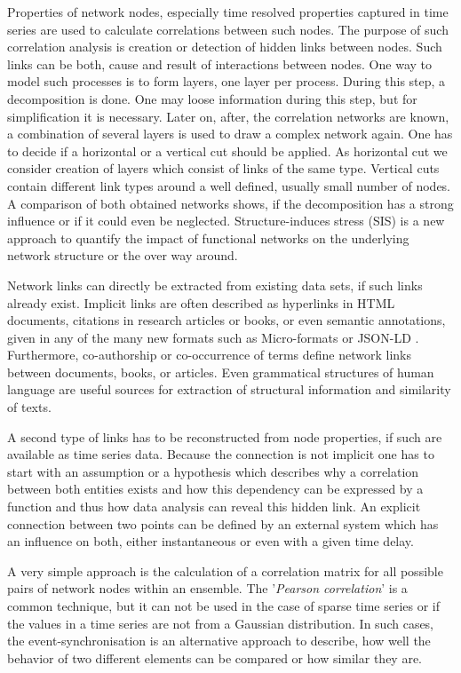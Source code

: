 \documentclass[a4paper,10pt]{scrbook}
\begin{document}
Properties of network nodes, especially time resolved properties captured in time series are used to calculate correlations between such nodes. The purpose of such correlation analysis is creation or detection of hidden links between nodes. Such links can be both, cause and result of interactions between nodes. One way to model such processes is to form layers, one layer per process. During this step, a decomposition is done. One may loose information during this step, but for simplification it is necessary. Later on, after, the correlation networks are known, a combination of several layers is used to draw a complex network again. One has to decide if a horizontal or a vertical cut should be applied. As horizontal cut we consider creation of layers which consist of links of the same type. Vertical cuts contain different link types around a well defined, usually small number of nodes. A comparison of both obtained networks shows, if the decomposition has a strong influence or if it could even be neglected. Structure-induces stress (SIS) is a new approach to quantify the impact of functional networks on the underlying network structure or the over way around.  

Network links can directly be extracted from existing data sets, if such links already exist. Implicit links are often described as hyperlinks in HTML documents, citations in research articles or books, or even semantic annotations, given in any of the many new formats such as Micro-formats \cite{MICROFORMATS} or JSON-LD \cite{JSON.LD}. Furthermore, co-authorship or co-occurrence of terms define network links between documents, books, or articles. Even grammatical structures of human language are useful sources for extraction of structural information \cite{Amanico2012} and similarity of texts.

A second type of links has to be reconstructed from node properties, if such are available as time series data. Because the connection is not implicit one has to start with an assumption or a hypothesis which describes why a correlation between both entities exists and how this dependency can be expressed by a function and thus how data analysis can reveal this hidden link. An explicit connection between two points can be defined by an external system which has an influence on both, either instantaneous or even with a given time delay. 

A very simple approach is the calculation of a correlation matrix for all possible pairs of network nodes within an ensemble. The '\textit{Pearson correlation}' is a common technique, but it can not be used in the case of sparse time series or if the values in a time series are not from a Gaussian distribution. In such cases, the event-synchronisation is an alternative approach to describe, how well the behavior of two different elements can be compared or how similar they are.
\end{document}
